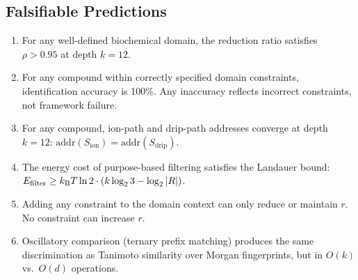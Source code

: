 \subsection{Falsifiable Predictions}
\label{sec:ch24-predictions}

\begin{enumerate}
  \item[\textbf{P1:}]
    For any well-defined biochemical domain, the reduction ratio satisfies
    $\rho > 0.95$ at depth $k = 12$.
  \item[\textbf{P2:}]
    For any compound within correctly specified domain constraints,
    identification accuracy is 100\%.  Any inaccuracy reflects incorrect
    constraints, not framework failure.
  \item[\textbf{P3:}]
    For any compound, ion-path and drip-path addresses converge at depth
    $k = 12$: $\mathrm{addr}(S_{\mathrm{ion}}) = \mathrm{addr}(S_{\mathrm{drip}})$.
  \item[\textbf{P4:}]
    The energy cost of purpose-based filtering satisfies the Landauer bound:
    $E_{\mathrm{filter}} \geq k_{\mathrm{B}} T \ln 2 \cdot (k \log_2 3 - \log_2 |R|)$.
  \item[\textbf{P5:}]
    Adding any constraint to the domain context can only reduce or maintain $r$.
    No constraint can increase $r$.
  \item[\textbf{P6:}]
    Oscillatory comparison (ternary prefix matching) produces the same
    discrimination as Tanimoto similarity over Morgan fingerprints, but in
    $O(k)$ vs.\ $O(d)$ operations.
\end{enumerate}

